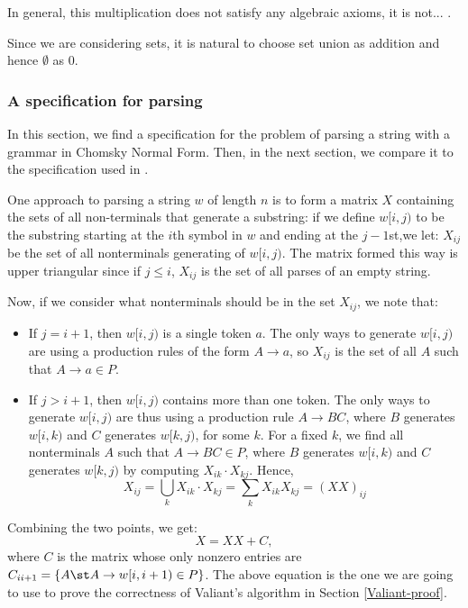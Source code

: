 In general, this multiplication does not satisfy any algebraic axioms, it is not... .

Since we are considering sets, it is natural to choose set union as addition and hence $\emptyset$ as $0$.
\subsubsection{A specification for parsing}
In this section, we find a specification for the problem of parsing a string with a grammar in Chomsky Normal Form. Then, in the next section, we compare it to the specification used in \cite{Valiant}.

One approach to parsing a string $w$ of length $n$ is to form a matrix $X$ containing the sets of all non-terminals that generate a substring: if we define $w[i,j)$ to be the substring starting at the $i$th symbol in $w$ and ending at the $j-1$st,we let: $X_{i j}$ be the set of all nonterminals generating of $w[i,j)$. The matrix formed this way is upper triangular since if $j \le i$, $X_{i j}$ is the set of all parses of an empty string.

Now, if we consider what nonterminals should be in the set $X_{i j}$, we note that:
\begin{itemize}
\item If $j = i + 1$, then $w[i,j)$ is a single token $a$. The only ways to generate $w[i,j)$ are using a production rules of the form $A \to a$, so $X_{i j}$ is the set of all $A$ such that $A \to a \in P$.
\item If $j > i + 1$, then $w[i,j)$ contains more than one token. The only ways to generate $w[i,j)$ are thus using a production rule $A \to BC$, where $B$ generates $w[i,k)$ and $C$ generates $w[k,j)$, for some $k$. For a fixed $k$, we find all nonterminals $A$ such that $A \to BC \in P$, where $B$ generates $w[i,k)$ and $C$ generates $w[k,j)$ by computing $X_{i k} \cdot X_{k j}$. Hence, 
            \begin{equation}
              X_{i j} = \bigcup_k X_{i k}\cdot X_{k j} = \sum_kX_{i k}X_{k j} = (XX)_{i j}
            \end{equation}
\end{itemize}
Combining the two points, we get:
\begin{equation}
  \label{TC}
  X = XX + C,
\end{equation}
where $C$ is the matrix whose only nonzero entries are $C_{i i+1} = \{A \st A \to w[i,i+1) \in P\}$. The above equation is the one we are going to use to prove the correctness of Valiant's algorithm in Section \ref{Valiant-proof}. 




